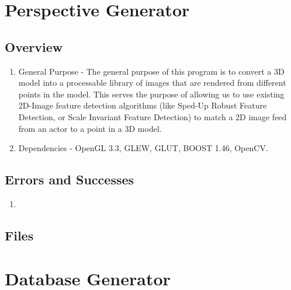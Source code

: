 \documentclass[a4paper,11pt]{article}
\begin{document}
    \section{Perspective Generator}

        \subsection{Overview}
        \begin{enumerate}
        \item General Purpose - The general purpose of this program is to convert a 3D model into a processable library of images that are rendered from different points in the model. This serves the purpose of allowing us to use existing 2D-Image feature detection algorithms (like Sped-Up Robust Feature Detection, or Scale Invariant Feature Detection) to match a 2D image feed from an actor to a point in a 3D model.
        \item Dependencies - OpenGL 3.3, GLEW, GLUT, BOOST 1.46, OpenCV.
        \end{enumerate}

        \subsection{Errors and Successes}
        \begin{enumerate}
        \item 
        \end{enumerate}

        \subsection{Files}

        



    \section{Database Generator}

  

  
\end{document}

